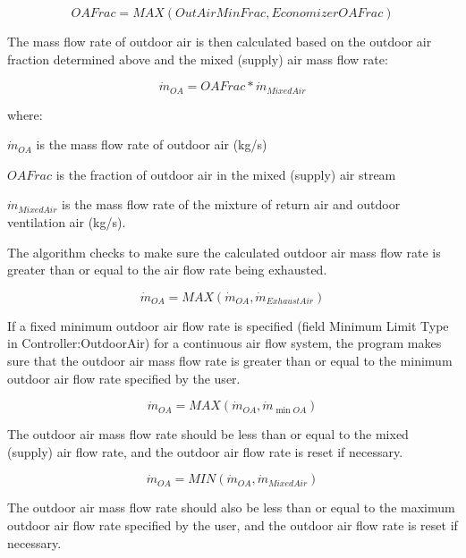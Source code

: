 \begin{equation}
OAFrac = MAX(OutAirMinFrac,EconomizerOAFrac)
\end{equation}

The mass flow rate of outdoor air is then calculated based on the outdoor air fraction determined above and the mixed (supply) air mass flow rate:

\begin{equation}
{\dot m_{OA}} = OAFrac * {\dot m_{MixedAir}}
\end{equation}

where:

\({\dot m_{OA}}\) is the mass flow rate of outdoor air (kg/s)

\(OAFrac\) is the fraction of outdoor air in the mixed (supply) air stream

\({\dot{m}_{MixedAir}}\) is the mass flow rate of the mixture of return air and outdoor ventilation air (kg/s).

The algorithm checks to make sure the calculated outdoor air mass flow rate is greater than or equal to the air flow rate being exhausted.

\begin{equation}
{\dot m_{OA}} = MAX\left( {{{\dot m}_{OA}},{{\dot m}_{ExhaustAir}}} \right)
\end{equation}

If a fixed minimum outdoor air flow rate is specified (field Minimum Limit Type in Controller:OutdoorAir) for a continuous air flow system, the program makes sure that the outdoor air mass flow rate is greater than or equal to the minimum outdoor air flow rate specified by the user.

\begin{equation}
{\dot m_{OA}} = MAX\left( {{{\dot m}_{OA}},{{\dot m}_{\min OA}}} \right)
\end{equation}

The outdoor air mass flow rate should be less than or equal to the mixed (supply) air flow rate, and the outdoor air flow rate is reset if necessary.

\begin{equation}
{\dot m_{OA}} = MIN\left( {{{\dot m}_{OA}},{{\dot m}_{MixedAir}}} \right)
\end{equation}

The outdoor air mass flow rate should also be less than or equal to the maximum outdoor air flow rate specified by the user, and the outdoor air flow rate is reset if necessary.

